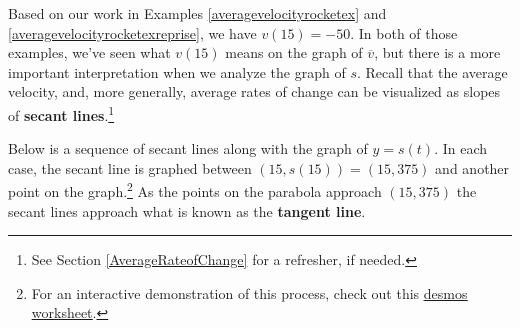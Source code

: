 \documentclass{ximera}
\begin{document}
\medskip

Based on our work in Examples \ref{averagevelocityrocketex}   and \ref{averagevelocityrocketexreprise}, we have  $v(15) = -50$.   In both of those examples, we've seen what $v(15)$ means on the graph of $\overline{v}$, but there is a more important interpretation when we analyze the graph of $s$.  Recall that the average velocity, and, more generally, average rates of change can be visualized as slopes of \textbf{secant lines}.\footnote{See Section \ref{AverageRateofChange} for a refresher, if needed.}  

\medskip

Below is a sequence of secant lines along with the graph of $y = s(t)$.  In each case, the secant line is graphed between $(15, s(15)) = (15, 375)$ and another point on the graph.\footnote{For an interactive demonstration of this process, check out this \href{https://www.desmos.com/calculator/mbqfpe4cmh}{\underline{desmos worksheet}}.} As the points on the parabola approach $(15, 375)$ the secant lines approach what is known as the \textbf{tangent line}.

\medskip
\end{document}
